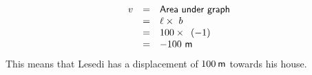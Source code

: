     \begin{equation}
    \begin{array}{ccc}\hfill v& =& \mathsf{Area}\phantom{\rule{3.33333pt}{0ex}}\mathsf{under}\phantom{\rule{3.33333pt}{0ex}}\mathsf{graph}\hfill \\ & =& \ell \ensuremath{\times}\phantom{\rule{3.33333pt}{0ex}}b\hfill \\ & =& 100\ensuremath{\times}\phantom{\rule{3.33333pt}{0ex}}\left(-1\right)\hfill \\ & =& -100\phantom{\rule{3.33333pt}{0ex}}\mathsf{m}\hfill \end{array}
      \end{equation}
        \label{m38795*id71010}This means that Lesedi has a displacement of $100\phantom{\rule{2pt}{0ex}}\mathsf{m}$ towards his house.\par 
\label{m38795*secfhsst!!!underscore!!!id2587}
